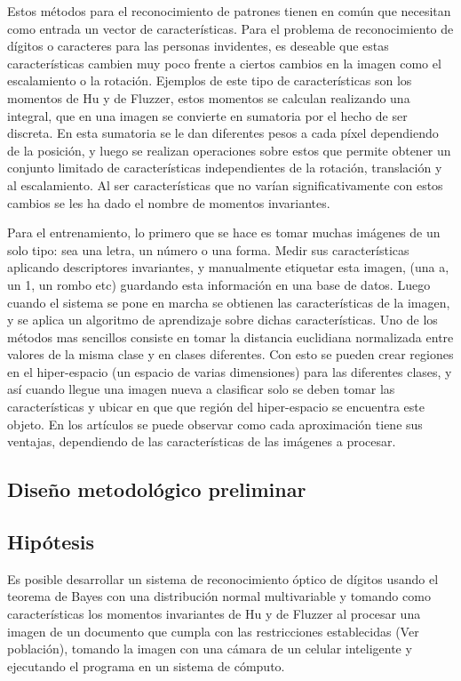 \documentclass[a4paper, 11pt, oneside]{article}
\begin{document}
	
	Estos métodos para el reconocimiento de patrones tienen en común que necesitan como
	entrada un vector de características. Para el problema de reconocimiento de dígitos
	o caracteres para las personas invidentes, es deseable que estas características cambien
	muy poco frente a ciertos cambios en la imagen como el escalamiento o la rotación.
	Ejemplos de este tipo de características son los momentos de Hu y de Fluzzer, estos
	momentos se calculan realizando una integral, que en una imagen se convierte en sumatoria
	por el hecho de ser discreta. En esta sumatoria se le dan diferentes pesos a cada píxel
	dependiendo de la posición, y luego se realizan operaciones sobre estos que permite
	obtener un conjunto limitado de características independientes de la rotación, translación
	y al escalamiento. Al ser características que no varían significativamente con estos 
	cambios se les ha dado el nombre de momentos invariantes.
	
	Para el entrenamiento, lo primero que se hace es tomar muchas imágenes de un solo tipo: sea una letra, un 
	número o una forma. Medir sus características aplicando descriptores invariantes, y manualmente 
    etiquetar esta imagen, (una a, un 1, un rombo etc) guardando esta información en una base de
    datos. Luego cuando el sistema se pone en marcha se obtienen las características de la imagen,
    y se aplica un algoritmo de aprendizaje sobre dichas características. Uno de los métodos mas
	sencillos consiste en tomar la distancia euclidiana normalizada entre valores de la misma
	clase y en clases diferentes. Con esto se pueden crear regiones en el hiper-espacio (un
	espacio de varias dimensiones) para las diferentes clases, y así cuando llegue una imagen
	nueva a clasificar solo se deben tomar las características y ubicar en que que región del
	hiper-espacio se encuentra este objeto. En los artículos se puede observar como  
	cada aproximación tiene sus ventajas, dependiendo de las características de las imágenes a
	procesar.
	\newpage
		
	\begin{center}
	\section{Diseño metodológico preliminar}
	\end{center}
	
	\subsection{Hipótesis}
	Es posible desarrollar un sistema de reconocimiento óptico de dígitos usando el teorema
	de Bayes con una distribución normal multivariable y tomando como características los
	momentos invariantes de Hu y de Fluzzer al procesar una imagen de un documento que 
	cumpla con las restricciones establecidas (Ver población), tomando la imagen con
	una cámara de un celular inteligente y ejecutando el programa en un sistema de cómputo.
		
\end{document}
